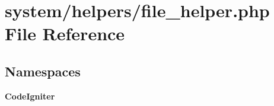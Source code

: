 \section{system/helpers/file\-\_\-helper.php File Reference}
\label{file__helper_8php}
\subsection*{Namespaces}
\begin{DoxyCompactItemize}
\item 
{\bf Code\-Igniter}
\end{DoxyCompactItemize}
